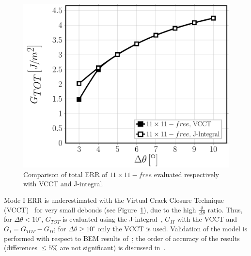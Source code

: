 \documentclass[12pt,a4paper]{article}
\begin{document}
\begin{figure}[!h]
\centering
        \includegraphics[height=0.3\textheight]{vf60-G-methodsaccuracy.pdf}
\caption{Comparison of total ERR of $11\times11-free$ evaluated respectively with VCCT and J-integral.}\label{fig:errerror}
\end{figure}

Mode I ERR is underestimated with the Virtual Crack Closure Technique (VCCT)~\cite{Krueger2004} for very small debonds (see Figure~\ref{fig:errerror}), due to the high $\frac{\delta}{\Delta\theta}$ ratio. Thus, for $\Delta\theta<10^{\circ}$, $G_{TOT}$ is evaluated using the J-integral~\cite{Rice1968}, $G_{II}$ with the VCCT and $G_{I}=G_{TOT}-G_{II}$; for $\Delta\theta\geq10^{\circ}$ only the VCCT is used. Validation of the model is performed with respect to BEM results of~\cite{Paris2007,Sandino2016}; the order of accuracy of the results (differences $\leq5\%$ are not significant) is discussed in~\cite{DiStasio2019}.
\end{document}
